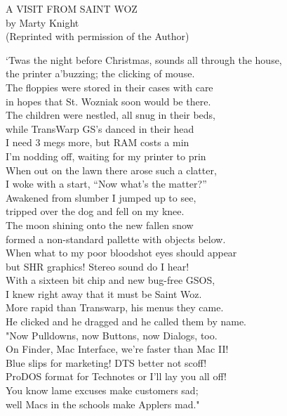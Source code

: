 \documentclass{report}
\newenvironment{usenet}{\raggedright\small\ttfamily}{\rmfamily}
\begin{document}
	\begin{usenet}
		A VISIT FROM SAINT WOZ\\
		by Marty Knight\\
		(Reprinted with permission of the Author)

		`Twas the night before Christmas, sounds all through the house,\\
		the printer a'buzzing; the clicking of mouse.\\
		The floppies were stored in their cases with care\\
		in hopes that St. Wozniak soon would be there.\\
		The children were nestled, all snug in their beds,\\
		while TransWarp GS's danced in their head\\
		I need 3 megs more, but RAM costs a min\\
		I'm nodding off, waiting for my printer to prin\\
		When out on the lawn there arose such a clatter,\\
		I woke with a start, ``Now what's the matter?''\\
		Awakened from slumber I jumped up to see,\\
		tripped over the dog and fell on my knee.\\
		The moon shining onto the new fallen snow\\
		formed a non-standard pallette with objects below.\\
		When what to my poor bloodshot eyes should appear\\
		but SHR graphics! Stereo sound do I hear!\\
		With a sixteen bit chip and new bug-free GSOS,\\
		I knew right away that it must be Saint Woz.\\
		More rapid than Transwarp, his menus they came.\\
		He clicked and he dragged and he called them by name.\\
		"Now Pulldowns, now Buttons, now Dialogs, too.\\
		On Finder, Mac Interface, we're faster than Mac II!\\
		Blue slips for marketing! DTS better not scoff!\\
		ProDOS format for Technotes or I'll lay you all off!\\
		You know lame excuses make customers sad;\\
		well Macs in the schools make Applers mad."\\

\end{usenet}
\end{document}
